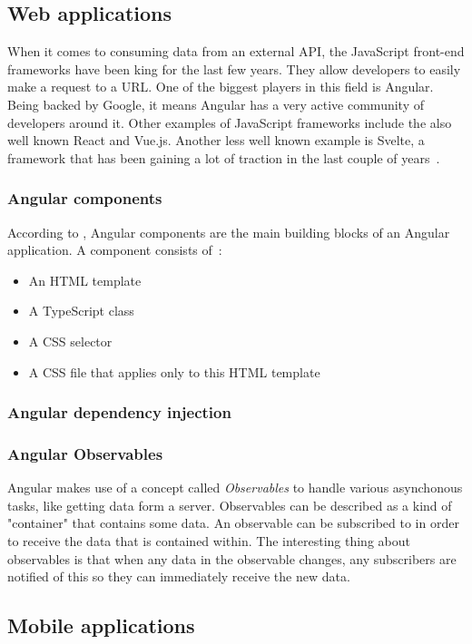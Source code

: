 \subsection{Web applications}

When it comes to consuming data from an external API, the JavaScript front-end frameworks have been king for the last few years. They allow developers to easily make a request to a URL. One of the biggest players in this field is Angular. Being backed by Google, it means Angular has a very active community of developers around it. Other examples of JavaScript frameworks include the also well known React and Vue.js. Another less well known example is Svelte, a framework that has been gaining a lot of traction in the last couple of years~\autocite{Uzayr2019}.

\subsubsection{Angular components}

According to \textcite{Freeman2020}, Angular components are the main building blocks of an Angular application. A component consists of~\autocite{Angular2022}:

\begin{itemize}
	\item An HTML template
	\item A TypeScript class
	\item A CSS selector
	\item A CSS file that applies only to this HTML template
\end{itemize}

\subsubsection{Angular dependency injection}

\subsubsection{Angular Observables}

Angular makes use of a concept called \emph{Observables} to handle various asynchonous tasks, like getting data form a server. Observables can be described as a kind of "container" that contains some data. An observable can be subscribed to in order to receive the data that is contained within. The interesting thing about observables is that when any data in the observable changes, any subscribers are notified of this so they can immediately receive the new data.

\subsection{Mobile applications}